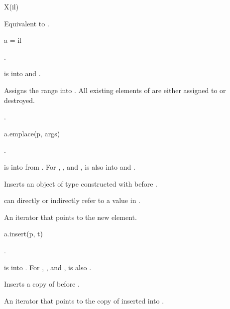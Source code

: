 \begin{itemdecl}
X(il)
\end{itemdecl}

\begin{itemdescr}
\pnum
\effects
Equivalent to .
\end{itemdescr}

\begin{itemdecl}
a = il
\end{itemdecl}

\begin{itemdescr}
\pnum
\result
{}.

\pnum
\expects
{} is  into  and
.

\pnum
\effects
Assigns the range  into .
All existing elements of  are either assigned to or destroyed.

\pnum
\returns
{}.
\end{itemdescr}

%
\begin{itemdecl}
a.emplace(p, args)
\end{itemdecl}

\begin{itemdescr}
\pnum
\result
{}.

\pnum
\expects
{} is  into  from .
For , , and ,
 is also  into  and
.

\pnum
\effects
Inserts an object of type 
constructed with 
before .
\begin{note}
 can directly or indirectly refer to a value in .
\end{note}

\pnum
\returns
An iterator that points to the new element.
\end{itemdescr}

%
\begin{itemdecl}
a.insert(p, t)
\end{itemdecl}

\begin{itemdescr}
\pnum
\result
{}.

\pnum
\expects
{} is  into .
For , , and ,
 is also .

\pnum
\effects
Inserts a copy of  before .

\pnum
\returns
An iterator that points to the copy of  inserted into .
\end{itemdescr}

